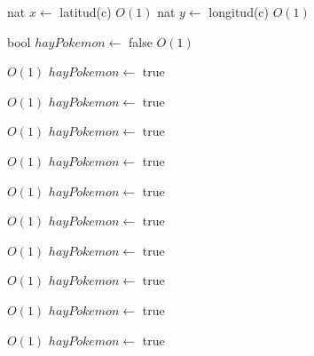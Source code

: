 \begin{Algoritmos}
\begin{algorithmic}[1]
\State nat $x \gets$ latitud(c)    \Comment $O(1)$
\State nat $y \gets$ longitud(c)   \Comment $O(1)$


\State bool $hayPokemon \gets$ false    \Comment $O(1)$

     \Comment $O(1)$
    \State $hayPokemon \gets$ true
\EndIf

         \Comment $O(1)$
        \State $hayPokemon \gets$ true
    \EndIf


             \Comment $O(1)$
            \State $hayPokemon \gets$ true
        \EndIf

    \EndIf

             \Comment $O(1)$
            \State $hayPokemon \gets$ true
        \EndIf
    \EndIf

             \Comment $O(1)$
            \State $hayPokemon \gets$ true
        \EndIf
    \EndIf

\EndIf


         \Comment $O(1)$
        \State $hayPokemon \gets$ true
    \EndIf


             \Comment $O(1)$
            \State $hayPokemon \gets$ true
        \EndIf

    \EndIf

\EndIf


         \Comment $O(1)$
        \State $hayPokemon \gets$ true
    \EndIf


             \Comment $O(1)$
            \State $hayPokemon \gets$ true
        \EndIf


    \EndIf

\EndIf

         \Comment $O(1)$
        \State $hayPokemon \gets$ true
        \EndIf


\end{algorithmic}
\end{Algoritmos}
